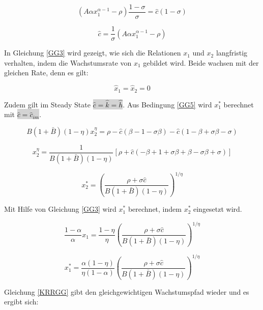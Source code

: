 	
	\begin{equation*}
		(A\alpha x_1^{\alpha-1}-\rho)\frac{1-\sigma}{\sigma}=\hat{c}(1-\sigma)
	\end{equation*}


	\begin{equation}
		\boxed{\hat{c}=\frac{1}{\sigma}(A\alpha x_1^{\alpha-1}-\rho)}\label{KRRGG}
	\end{equation}


In Gleichung \eqref{GG3} wird gezeigt, wie sich die Relationen $x_1$ und $x_2$ langfristig verhalten, indem die Wachstumsrate von $x_1$ gebildet wird. Beide wachsen mit der gleichen Rate, denn es gilt:


	\begin{equation}
		\hat{x}_1=\hat{x}_2=0
	\end{equation}


Zudem gilt im Steady State \colorbox{lightgray}{$\hat{c}=\hat{k}=\hat{h}$}.
Aus Bedingung \eqref{GG5} wird $x_1^*$ berechnet mit \colorbox{lightgray}{$\hat{c}=\hat{c}_{im}$}.


	\begin{equation}
		B(1+\bar{B})(1-\eta)x_2^\eta=\rho-\hat{c}(\beta-1-\sigma\beta)-\hat{c}(1-\beta+\sigma\beta-\sigma)
	\end{equation}


	\begin{equation*}
		x_2^\eta=\frac{1}{B(1+\bar{B})(1-\eta)}\left[\rho+\hat{c}(-\beta+1+\sigma\beta+\beta-\sigma\beta+\sigma)\right]
	\end{equation*}


	\begin{equation}
		x_2^*=\left(\frac{\rho+\sigma\hat{c}}{B(1+\bar{B})(1-\eta)}\right)^{1/\eta}
	\end{equation}


Mit Hilfe von Gleichung \eqref{GG3} wird $x_1^*$ berechnet, indem $x_2^*$ eingesetzt wird.


	\begin{equation}
		\frac{1-\alpha}{\alpha}x_1 =\frac{1-\eta}{\eta}\left(\frac{\rho+\sigma\hat{c}}{B(1+\bar{B})(1-\eta)}\right)^{1/\eta}
	\end{equation}


	\begin{equation}
		x_1^* =\frac{\alpha(1-\eta)}{\eta(1-\alpha)}\left(\frac{\rho+\sigma\hat{c}}{B(1+\bar{B})(1-\eta)}\right)^{1/\eta}
	\end{equation}


Gleichung \eqref{KRRGG} gibt den gleichgewichtigen Wachstumspfad wieder und es ergibt sich: 


